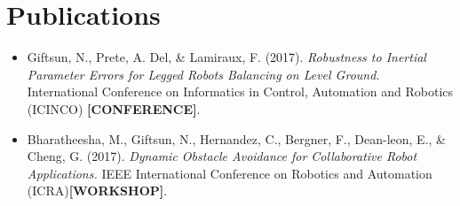 \documentclass[a4paper,11pt,twoside]{StyleThese}
\begin{document}
\section{Publications}
\begin{itemize}
\item Giftsun, N., Prete, A. Del, \& Lamiraux, F. (2017). \textit{Robustness to Inertial Parameter Errors for Legged Robots Balancing on Level Ground.} International Conference on Informatics in Control, Automation and Robotics (ICINCO) \textbf{[CONFERENCE]}.
\item Bharatheesha, M., Giftsun, N., Hernandez, C., Bergner, F., Dean-leon, E., \& Cheng, G. (2017). \textit{Dynamic Obstacle Avoidance for Collaborative Robot Applications.} IEEE International Conference on Robotics and Automation (ICRA)\textbf{[WORKSHOP]}.
\end{itemize}
\ifdefined{}
\else


\end{document}
